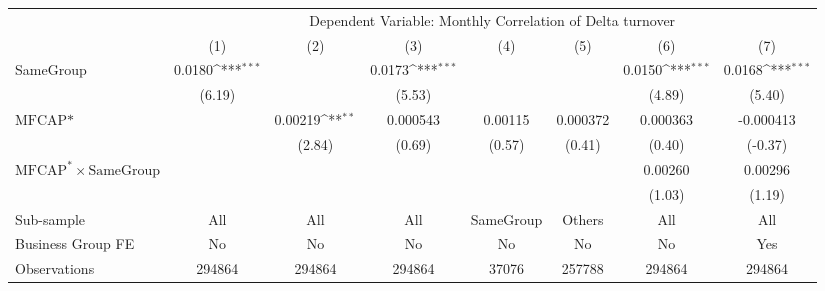 {
\def\sym#1{\ifmmode^{#1}\else\(^{#1}\)\fi}
\begin{tabular}{l*{7}{c}}
\hline\hline
                    &\multicolumn{7}{c}{Dependent Variable:  Monthly Correlation of Delta turnover}                                                                           \\\cmidrule(lr){2-8}
                    &\multicolumn{1}{c}{(1)}         &\multicolumn{1}{c}{(2)}         &\multicolumn{1}{c}{(3)}         &\multicolumn{1}{c}{(4)}         &\multicolumn{1}{c}{(5)}         &\multicolumn{1}{c}{(6)}         &\multicolumn{1}{c}{(7)}         \\
\hline
SameGroup           &      0.0180\sym{***}&                     &      0.0173\sym{***}&                     &                     &      0.0150\sym{***}&      0.0168\sym{***}\\
                    &      (6.19)         &                     &      (5.53)         &                     &                     &      (4.89)         &      (5.40)         \\
[1em]
$ \text{MFCAP*} $   &                     &     0.00219\sym{**} &    0.000543         &     0.00115         &    0.000372         &    0.000363         &   -0.000413         \\
                    &                     &      (2.84)         &      (0.69)         &      (0.57)         &      (0.41)         &      (0.40)         &     (-0.37)         \\
[1em]
 $ \text{MFCAP}^* \times {\text{SameGroup} }  $ &                     &                     &                     &                     &                     &     0.00260         &     0.00296         \\
                    &                     &                     &                     &                     &                     &      (1.03)         &      (1.19)         \\
\hline
Sub-sample          &         All         &         All         &         All         &   SameGroup         &      Others         &         All         &         All         \\
Business Group FE   &          No         &          No         &          No         &          No         &          No         &          No         &         Yes         \\
Observations        &      294864         &      294864         &      294864         &       37076         &      257788         &      294864         &      294864         \\
\hline\hline  \end{tabular}}
